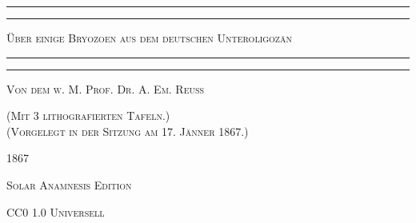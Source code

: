 \documentclass[a4paper, 11pt, oneside, german]{article}
\begin{document}
\begin{titlepage} %
	\centering %

	
	\rule{\textwidth}{1.6pt}\vspace*{-\baselineskip}\vspace*{2pt} %
	\rule{\textwidth}{0.4pt} %
	
	\vspace{1\baselineskip} %
	
	{\scshape\LARGE Über einige Bryozoen aus dem deutschen Unteroligozän\\[1.25pt]}
	
	\vspace{1\baselineskip} %

	\rule{\textwidth}{0.4pt}\vspace*{-\baselineskip}\vspace{3.2pt} %
	\rule{\textwidth}{1.6pt} %
	
	\vspace{1\baselineskip} %
	
	
	{\scshape Von dem w. M. Prof. \large Dr. A. Em. Reuss} %
	
	\vspace{1\baselineskip}
	
    {\scshape\small (Mit 3 lithografierten Tafeln.)\\(Vorgelegt in der Sitzung am 17. Jänner 1867.)} %
    \vspace*{\fill}

	{\small\scshape 1867}
		
	\vspace{0.5\baselineskip} %

    {\scshape Solar Anamnesis Edition}  %
	
	{\scshape\small CC0 1.0 Universell} %
\end{titlepage}
\setlength{\parskip}{1mm plus1mm minus1mm}
\clearpage
\tableofcontents
\clearpage
\end{document}
